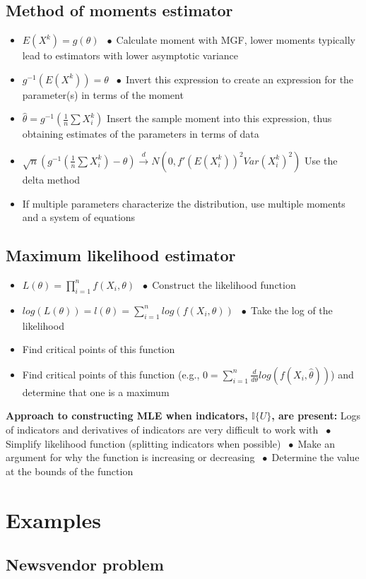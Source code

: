 \documentclass{article}
\newcommand*\bspace{$\; \bullet \;$}
\begin{document}
\subsection{Method of moments estimator}
\begin{itemize}
    \item $E(X^k) = g(\theta)$ \bspace Calculate moment with MGF, lower moments typically lead to estimators with lower asymptotic variance
    \item $g^{-1}(E(X^k)) = \theta$ \bspace Invert this expression to create an expression for the parameter(s) in terms of the moment
    \item $\hat{\theta} = g^{-1}(\frac{1}{n}\sum X_i^k)$ Insert the sample moment into this expression, thus obtaining estimates of the parameters in terms of data
    \item $\sqrt{n}(g^{-1}(\frac{1}{n}\sum X_i^k) - \theta) \overset{d}{\longrightarrow}  N(0, f'(E(X_i^k))^2Var(X_i^k)^2)$ Use the delta method
    \item If multiple parameters characterize the distribution, use multiple moments and a system of equations
\end{itemize}

\subsection{Maximum likelihood estimator}
\begin{itemize}
    \item $L(\theta) = \prod_{i=1}^nf(X_i, \theta)$ \bspace Construct the likelihood function
    \item $log(L(\theta)) = l(\theta) = \sum_{i=1}^nlog(f(X_i, \theta))$ \bspace Take the log of the likelihood
    \item Find critical points of this function 
    \item Find critical points of this function (e.g., $0 = \sum_{i=1}^n\frac{d}{d\theta}log(f(X_i, \hat{\theta}))$) and determine that one is a maximum
\end{itemize}
\textbf{Approach to constructing MLE when indicators, $\mathbb{I}\{U\}$, are present:} Logs of indicators and derivatives of indicators are very difficult to work with \bspace Simplify likelihood function (splitting indicators when possible) \bspace Make an argument for why the function is increasing or decreasing \bspace Determine the value at the bounds of the function


\section{Examples}
\subsection{Newsvendor problem}
\end{document}
